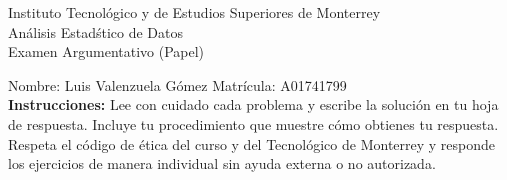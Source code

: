 \documentclass[10pt]{report}
\begin{document}
\newpage



\begin{center}
{\large Instituto Tecnol\'{o}gico y de Estudios Superiores de Monterrey \\
An\'alisis Estad\'stico de Datos } \\
Examen Argumentativo (Papel)
\end{center}

Nombre: \underline{\hspace*{.2in}}
Luis Valenzuela G\'omez
\underline{\hspace*{.2in}} \quad Matr\'icula:\underline{\hspace*{.2in}}
A01741799
\underline{\hspace*{.2in}} \\

{\bf Instrucciones:} Lee con cuidado cada problema y escribe la soluci\'on
en tu hoja de respuesta. Incluye tu procedimiento que muestre c\'omo obtienes tu respuesta.  Respeta el c\'odigo de \'etica del curso y del Tecnol\'ogico de Monterrey y responde los ejercicios de manera individual sin ayuda externa o no autorizada.
\end{document}
